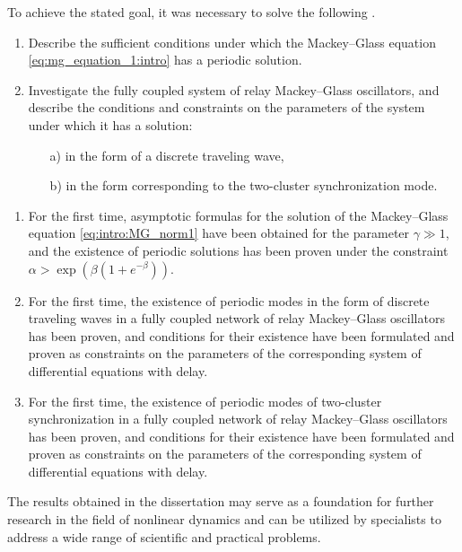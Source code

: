 To achieve the stated goal, it was necessary to solve the following {\tasks}.
\begin{enumerate}[beginpenalty=10000] %
	\item Describe the sufficient conditions under which the Mackey--Glass equation \eqref{eq:mg_equation_1:intro} has a periodic solution.
	\item Investigate the fully coupled system of relay Mackey--Glass oscillators, and describe the conditions and constraints on the parameters of the system under which it has a solution:
	\begin{enumerate}
		\item[a)]in the form of a discrete traveling wave,
		\item[b)]in the form corresponding to the two-cluster synchronization mode.
	\end{enumerate}
\end{enumerate}

\bigskip

{\novelty}
\begin{enumerate}[beginpenalty=10000] %
	\item For the first time, asymptotic formulas for the solution of the Mackey--Glass equation \eqref{eq:intro:MG_norm1} have been obtained for the parameter $\gamma \gg 1$, and the existence of periodic solutions has been proven under the constraint  $\alpha > \exp\left(\beta(1 + e^{-\beta})\right)$.
	\item For the first time, the existence of periodic modes in the form of discrete traveling waves in a fully coupled network of relay Mackey--Glass oscillators has been proven, and conditions for their existence have been formulated and proven as constraints on the parameters of the corresponding system of differential equations with delay.
	\item For the first time, the existence of periodic modes of two-cluster synchronization in a fully coupled network of relay Mackey--Glass oscillators has been proven, and conditions for their existence have been formulated and proven as constraints on the parameters of the corresponding system of differential equations with delay.
\end{enumerate}

\bigskip

{\influence} The results obtained in the dissertation may serve as a foundation for further research in the field of nonlinear dynamics and can be utilized by specialists to address a wide range of scientific and practical problems.

